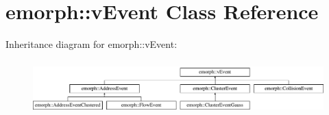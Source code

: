 \hypertarget{classemorph_1_1vEvent}{\section{emorph\-:\-:v\-Event Class Reference}
\label{classemorph_1_1vEvent}
}
Inheritance diagram for emorph\-:\-:v\-Event\-:\begin{figure}[H]
\begin{center}
\leavevmode
\includegraphics[height=2.089552cm]{classemorph_1_1vEvent}
\end{center}
\end{figure}
